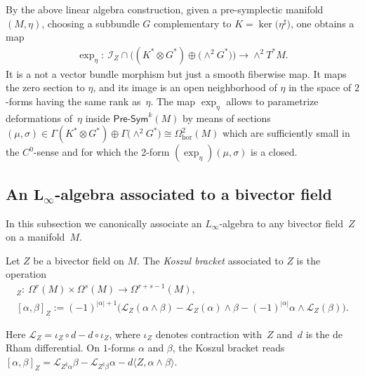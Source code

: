 \documentclass[10pt,a4paper]{amsart}
\numberwithin{equation}{section}
\newcommand{\Presym}{\mathsf{Pre}\textrm{-}\mathsf{Sym}}
\newcommand{\hor}{\mathrm{hor}}
\newcommand{\Lie}{\mathcal{L}}
\begin{document}
\begin{Remark}\label{rem:parametrize}By the above linear algebra construction, given a pre-symplectic manifold $(M,\eta)$, choosing a subbundle $G$ complementary to $K=\ker\big(\eta^\sharp\big)$, one obtains a map
\begin{gather}\label{eq:expetavb}
\exp_{\eta}\colon \ {\mathcal{I}_Z} \cap \big((K^*\otimes G^*)\oplus \big({\wedge}^2 G^*\big)\big) \to \wedge^2 T^*M.
\end{gather}
It is a not a vector bundle morphism but just a smooth fiberwise map. It maps the zero section to $\eta$, and its image is an open neighborhood of $\eta$ in the space of $2$-forms having the same rank as~$\eta$. The map $\exp_{\eta}$ allows to parametrize deformations of~$\eta$ inside $\Presym^k(M)$ by means of sections $(\mu, \sigma)\in \Gamma(K^*\otimes G^*)\oplus \Gamma\big({\wedge}^2 G^*\big) \cong \Omega_\hor^2(M)$ which are sufficiently small in the $C^0$-sense and for which the 2-form $(\exp_{\eta})(\mu,\sigma)$ is a closed.
\end{Remark}

\subsection[An $L_\infty$-algebra associated to a bivector field]{An $\boldsymbol{L_\infty}$-algebra associated to a bivector field}\label{subsection: Koszul for bivectors}

In this subsection we canonically associate an $L_\infty$-algebra to any bivector field~$Z$ on a manifold~$M$.

\begin{Definition}\label{definition: Koszul bracket of bivector field}Let $Z$ be a bivector field on $M$. The {\em Koszul bracket} associated to $Z$ is the operation
\begin{gather*}
 [\cdot,\cdot]_Z\colon \ \Omega^r(M) \times \Omega^s(M) \to \Omega^{r+s-1}(M),\\
 [\alpha,\beta]_Z:=(-1)^{|\alpha|+1} \big (\Lie_Z(\alpha\wedge \beta)-\Lie_Z(\alpha)\wedge \beta - (-1)^{|\alpha|}\alpha \wedge \Lie_Z(\beta)\big).
 \end{gather*}
\end{Definition}

Here $\Lie_Z = \iota_Z \circ d - d \circ \iota_Z$, where $\iota_Z$ denotes contraction with~$Z$ and~$d$ is the de Rham differential. On $1$-forms $\alpha$ and $\beta$, the Koszul bracket reads $[\alpha,\beta]_Z=\Lie_{Z^{\sharp}\alpha} \beta -\Lie_{Z^{\sharp}\beta} \alpha-d\langle Z, \alpha\wedge \beta\rangle$.
\end{document}
